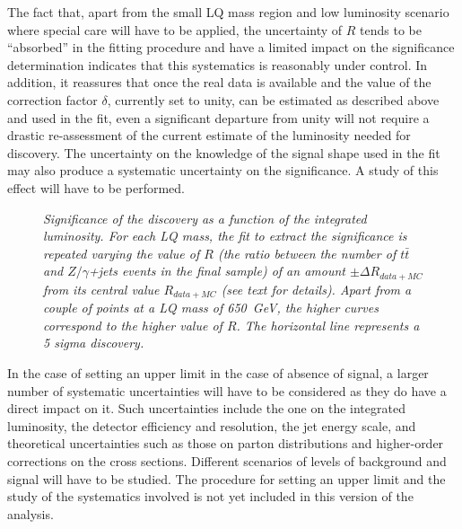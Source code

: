 The fact that, apart from the small LQ mass region and low luminosity scenario where special care
will have to be applied, the uncertainty 
of $R$ tends to be ``absorbed'' in the fitting procedure and have a limited impact on the 
significance determination indicates that this systematics is reasonably under control. 
In addition, it reassures that once the real data is available and the value of the correction 
factor $\delta$, currently set to unity, can be estimated as described above and used in the fit,
even a significant departure from unity will not require a drastic re-assessment of
the current estimate of the luminosity needed for discovery.
The uncertainty on the knowledge of the signal shape used in the fit may also produce a systematic
uncertainty on the significance. A study of this effect will have to be performed.

 \begin{figure}
   \begin{center}
     \caption{\small \sl Significance of the discovery as a function of the integrated luminosity.
       For each LQ mass, the fit to extract the significance is repeated varying the value of $R$
       (the ratio between the number of $t\bar{t}$ and $Z/\gamma$+jets events in the final sample)
       of an amount $\pm\Delta R_{data+MC}$ from its central value $R_{data+MC}$ 
       (see text for details).
       Apart from a couple of points at a LQ mass of 650~GeV, the higher curves correspond to
       the higher value of $R$. 
       The horizontal line represents a 5 sigma discovery.}
     \label{fig:sign_vs_Lint_sysR}
   \end{center}
 \end{figure}

In the case of setting an upper limit in the case of absence of signal, a larger number of systematic
uncertainties will have to be considered as they do have a direct impact on it. 
Such uncertainties include the one on the integrated luminosity, the detector efficiency and 
resolution, the jet energy scale, and theoretical uncertainties such as those on parton distributions
and higher-order corrections on the cross sections. Different scenarios of levels of background
and signal will have to be studied. The procedure for setting an upper limit and the study of the 
systematics involved is not yet included in this version of the analysis.



%
